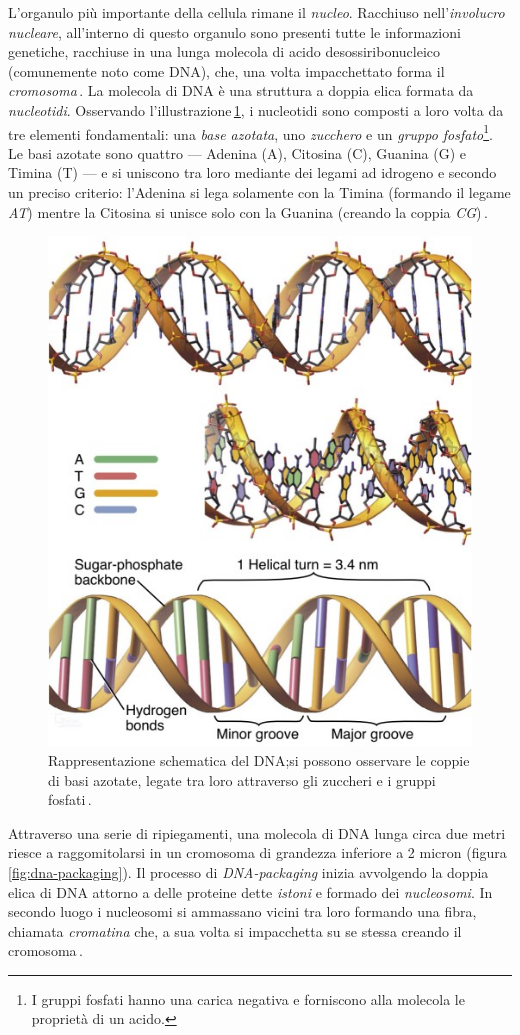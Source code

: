 L'organulo più importante della cellula rimane il \textsl{nucleo}. Racchiuso nell'\textsl{involucro nucleare}, all'interno di questo organulo sono presenti tutte le informazioni genetiche, racchiuse in una lunga molecola di acido desossiribonucleico (comunemente noto come DNA), che, una volta impacchettato forma il \textsl{cromosoma}\,\cite{pollard2022cell, alberts2015essential}. La molecola di DNA è una struttura a doppia elica formata da \textsl{nucleotidi}. Osservando l'illustrazione\,\ref{fig:dna}, i nucleotidi sono composti a loro volta da tre elementi fondamentali: una \textsl{base azotata}, uno \textsl{zucchero} e un \textsl{gruppo fosfato}\footnote{I gruppi fosfati hanno una carica negativa e forniscono alla molecola le proprietà di un acido.}. Le basi azotate sono quattro — Adenina (A), Citosina (C), Guanina (G) e Timina (T) — e si uniscono tra loro mediante dei legami ad idrogeno e secondo un preciso criterio: l'Adenina si lega solamente con la Timina (formando il legame \textit{AT}) mentre la Citosina si unisce solo con la Guanina (creando la coppia \textit{CG})\,\cite{fonseca2000hydrogen, sahu2011identification}. 
% 
\begin{figure}[b!]
    \centering
    \includegraphics[width=.5\textwidth]{assets/dna.jpg}
    \caption[Rappresentazione schematica del DNA.]{Rappresentazione schematica del DNA;\@ si possono osservare le coppie di basi azotate, legate tra loro attraverso gli zuccheri e i gruppi fosfati\,\cite{pollard2022cell}.}\label{fig:dna}
\end{figure}
% 
Attraverso una serie di ripiegamenti, una molecola di DNA lunga circa due metri riesce a raggomitolarsi in un cromosoma di grandezza inferiore a 2 micron (figura\,\ref{fig:dna-packaging}). Il processo di \textit{DNA-packaging} inizia avvolgendo la doppia elica di DNA attorno a delle proteine dette \textsl{istoni} e formado dei \textsl{nucleosomi}. In secondo luogo i nucleosomi si ammassano vicini tra loro formando una fibra, chiamata \textsl{cromatina} che, a sua volta si impacchetta su se stessa creando il cromosoma\,\cite{jansen2011nucleosome, zheng2010packaging}.

